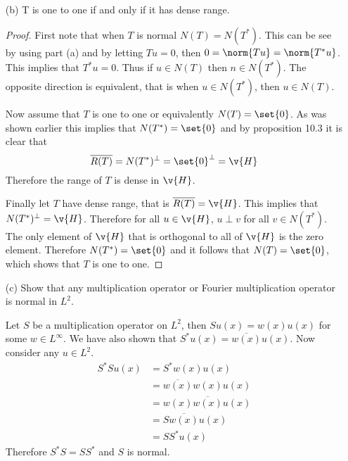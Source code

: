 \documentclass[11pt, oneside]{article}
\begin{document}
\begin{enumerate}
\begin{enumerate}
      \item[(b)] %
        T is one to one if and only if it has dense range.

        \begin{proof}
          First note that when $T$ is normal $N(T) = N(T^*)$.
          This can be see by using part (a) and by letting $Tu = 0$, then
          $0 = \norm{Tu} = \norm{T^*u}$.
          This implies that $T^* u = 0$.
          Thus if $u \in N(T)$ then $n \in N(T^*)$.
          The opposite direction is equivalent, that is when $u \in N(T^*)$,
          then $u \in N(T)$.

          Now assume that $T$ is one to one or equivalently $N(T) = \set{0}$.
          As was shown earlier this implies that $N(T^*) = \set{0}$ and by
          proposition 10.3 it is clear that
          \[
            \overline{R(T)} = N(T^*)^{\perp} = \set{0}^{\perp} = \v{H}
          \]
          Therefore the range of $T$ is dense in $\v{H}$.

          Finally let $T$ have dense range, that is $\overline{R(T)} = \v{H}$.
          This implies that $N(T^*)^{\perp} = \v{H}$.
          Therefore for all $u \in \v{H}$, $u \perp v$ for all $v \in N(T^*)$.
          The only element of $\v{H}$ that is orthogonal to all of $\v{H}$ is
          the zero element.
          Therefore $N(T^*) = \set{0}$ and it follows that $N(T) = \set{0}$,
          which shows that $T$ is one to one.
        \end{proof}

      \item[(c)] %
        Show that any multiplication operator or Fourier multiplication
        operator is normal in $L^2$.

        Let $S$ be a multiplication operator on $L^2$, then $Su(x) = w(x) u(x)$ for
        some $w \in L^{\infty}$.
        We have also shown that $S^* u(x) = \overline{w(x)} u(x)$.
        Now consider any $u \in L^2$.
        \begin{align*}
          S^*Su(x) &= S^*w(x)u(x) \\
          &= \overline{w(x)}w(x) u(x) \\
          &= w(x) \overline{w(x)} u(x) \\
          &= S \overline{w(x)}u(x) \\
          &= SS^* u(x)
        \end{align*}
        Therefore $S^*S = SS^*$ and $S$ is normal.


\end{enumerate}
\end{enumerate}
\end{document}
